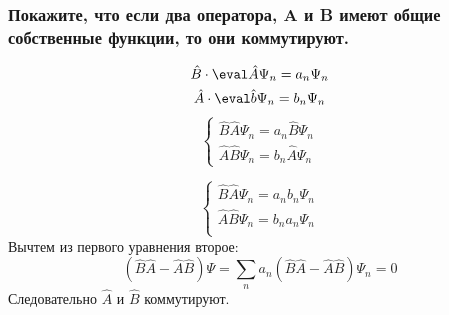 \subsubsection{Покажите, что если два оператора, A и B имеют общие собственные функции, то
они коммутируют.}


\begin{gather*}
	\hat{B}\cdot\eval \hat{A}\Psi_n=a_n\Psi_n \\
	\hat{A}\cdot\eval \hat{b}\Psi_n=b_n\Psi_n
\end{gather*}
\begin{equation*}
\begin{cases}
	\hat{B}\hat{A}\Psi_n=a_n\hat{B}\Psi_n \\
	\hat{A}\hat{B}\Psi_n=b_n\hat{A}\Psi_n
\end{cases}
\end{equation*}

\begin{equation*}
\begin{cases}
	\hat{B}\hat{A}\Psi_n=a_nb_n\Psi_n \\
	\hat{A}\hat{B}\Psi_n=b_na_n\Psi_n \\
\end{cases}
\end{equation*}
Вычтем из первого уравнения второе:
\begin{equation*}
	(\hat{B}\hat{A}-\hat{A}\hat{B})\Psi=\sum\limits_n a_n (\hat{B}\hat{A}-\hat{A}\hat{B})\Psi_n=0
\end{equation*}
Следовательно $\hat{A}$  и $\hat{B}$ коммутируют.